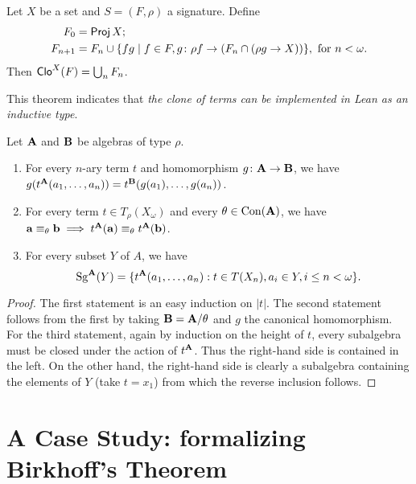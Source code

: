 \documentclass[11pt]{amsart}  %
\begin{document}
\begin{theorem} 
 Let $X$ be a set and $S = (F, \rho)$ a signature.
  Define
  \begin{align*}
    F_0 &= \operatorname{\mathsf{Proj}} X;\\
   F_{n+1} &= F_n \cup \{ f g \mid f \in F, g \colon \rho f \to (F_n \cap (\rho g \to X)) \}, \text{ for } n < \omega.
   \end{align*}
   Then $\operatorname{\mathsf{Clo}}^X(F) =  \bigcup_n F_n$.
\end{theorem}
This theorem indicates that \emph{the clone of terms can be implemented in Lean as an inductive type}. 






\begin{theorem} 
  \label{thm:4.32} 
Let $\mathbf{A}$ and $\mathbf{B}$ be algebras of type $\rho$.
\begin{enumerate}
  \item
    For every $n$-ary term $t$ and homomorphism $g\colon \mathbf{A} \to \mathbf{B}$, 
    we have 
    $g(t^{\mathbf{A}}(a_1,\dots, a_n)) = t^{\mathbf{B}}(g(a_1),\dots, g(a_n))$.
  \item
    For every term $t \in T_\rho(X_\omega)$ and every $\theta \in \operatorname{Con}(\mathbf{A})$, we have
    $\mathbf{a} \equiv_\theta \mathbf{b} \implies t^{\mathbf{A}}(\mathbf{a}) \equiv_\theta t^{\mathbf{A}}(\mathbf{b})$.
  \item
    For every subset $Y$ of $A$, we have
    \[\operatorname{Sg}^{\mathbf{A}}(Y) = 
    \{ t^{\mathbf{A}}(a_1,\dots, a_n) : t \in T(X_n), a_i \in Y, i \leq n < \omega\}.\]
\end{enumerate}
\end{theorem}
\begin{proof} 
  The first statement is an easy induction on $|t|$. 
  The second statement follows from the first by taking $\mathbf{B} = \mathbf{A}/\theta$ 
  and $g$ the canonical homomorphism. For the third statement, again by induction on the 
  height of $t$, every subalgebra must be closed under the action of $t^{\mathbf{A}}$. 
  Thus the right-hand side is contained in the left. On the other hand, the right-hand 
  side is clearly a subalgebra containing the elements of $Y$ (take $t = x_1$) from 
  which the reverse inclusion follows.
\end{proof}


\section{A Case Study: formalizing Birkhoff's Theorem}
\end{document}
